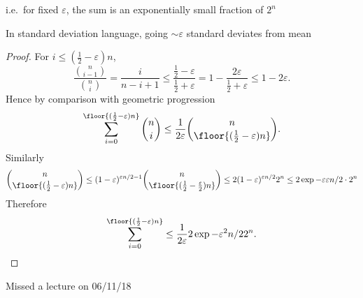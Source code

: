 \documentclass[a4paper]{article}
\begin{document}
i.e.\ for fixed \(\varepsilon\), the sum is an exponentially small fraction of \(2^n\)

In standard deviation language, going \(\sim \varepsilon\) standard deviates from mean

\begin{proof}
  For \(i \leq (\frac{1}{2} - \varepsilon) n\),
  \[
    \frac{\binom{n}{i - 1}}{\binom{n}{i}}
    = \frac{i}{n - i + 1}
    \leq \frac{\frac{1}{2} - \varepsilon}{\frac{1}{2} + \varepsilon}
    = 1 - \frac{2\varepsilon}{\frac{1}{2} + \varepsilon}
    \leq 1 - 2\varepsilon.
  \]
  Hence by comparison with geometric progression
  \[
    \sum_{i = 0}^{\floor{(\frac{1}{2} - \varepsilon) n}} \binom{n}{i}
    \leq \frac{1}{2\varepsilon} \binom{n}{\floor{(\frac{1}{2} - \varepsilon) n}}.
  \]
  Similarly
  \[
    \binom{n}{\floor{(\frac{1}{2} - \varepsilon)n}}
    \leq (1 - \varepsilon)^{\varepsilon n / 2 - 1} \binom{n}{\floor{(\frac{1}{2} - \frac{\varepsilon}{2}) n}} %
    \leq 2(1 - \varepsilon)^{\varepsilon n/2} 2^n
    \leq 2 \exp{-\varepsilon \varepsilon n /2} \cdot 2^n
  \]
  Therefore
  \[
    \sum_{i = 0}^{\floor{(\frac{1}{2} - \varepsilon)n}} \leq \frac{1}{2\varepsilon} 2 \exp{- \varepsilon^2n /2} 2^n.
  \]
\end{proof}


Missed a lecture on 06/11/18










\printindex
\end{document}
